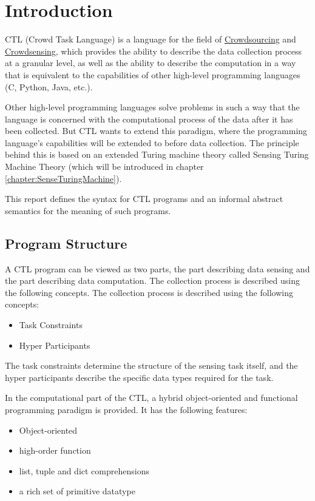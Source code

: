 \chapter{Introduction}

CTL (Crowd Task Language) is a language for the field of \href{https://en.wikipedia.org/wiki/Crowdsourcing}{Crowdsourcing} and \href{https://en.wikipedia.org/wiki/Crowdsensing}{Crowdsensing}, which provides the ability to describe the data collection process at a granular level, as well as the ability to describe the computation in a way that is equivalent to the capabilities of other high-level programming languages (C, Python, Java, etc.).

Other high-level programming languages solve problems in such a way that the language is concerned with the computational process of the data after it has been collected. But CTL wants to extend this paradigm, where the programming language's capabilities will be extended to before data collection. The principle behind this is based on an extended Turing machine theory called Sensing Turing Machine Theory (which will be introduced in chapter \ref{chapter:SenseTuringMachine}).

This report defines the syntax for CTL programs and an informal abstract semantics for the meaning of such programs.
\section{Program Structure}
A CTL program can be viewed as two parts, the part describing data sensing and the part describing data computation. The collection process is described using the following concepts.
The collection process is described using the following concepts:
\begin{itemize}
    \item Task Constraints 
    \item Hyper Participants 
\end{itemize}
The task constraints determine the structure of the sensing task itself, and the hyper participants describe the specific data types required for the task.

In the computational part of the CTL, a hybrid object-oriented and functional programming paradigm is provided. It has the following features:
\begin{itemize}
    \item Object-oriented
    \item high-order function
    \item list, tuple and dict comprehensions
    \item a rich set of primitive datatype
\end{itemize}

